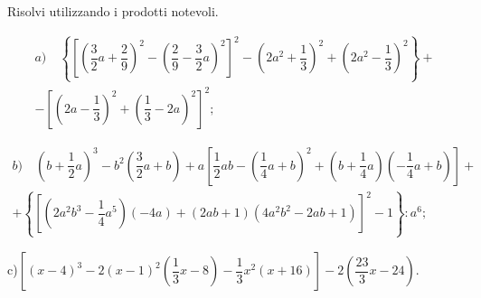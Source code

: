\begin{esercizio}[\Ast]
 \label{ese:12.39}
Risolvi utilizzando i prodotti notevoli.

 \begin{multline*} a)\quad \left\lbrace\left[\left(\dfrac{3}{2}a+\dfrac{2}{9}\right)^{2}-\left(\dfrac{2}{9}-\dfrac{3}{2}a\right)^{2}\right]^{2}-\left(2a^{2}+\dfrac{1}{3}\right)^{2}+\left(2a^{2}-\dfrac{1}{3}\right)^{2}\right\rbrace+\\-\left[\left(2a-\dfrac{1}{3}\right)^{2}+\left(\dfrac{1}{3}-2a\right)^{2}\right]^{2};\end{multline*}
 
 \begin{multline*} b)\quad \left(b+\dfrac{1}{2}a\right)^{3}-b^{2}\left(\dfrac{3}{2}a+b\right)+a\left[\dfrac{1}{2}ab-\left(\dfrac{1}{4}a+b\right)^{2}+\left(b+\dfrac{1}{4}a\right)\left(-\dfrac{1}{4}a+b\right)\right]+\\+\left\lbrace\left[\left(2a^{2}b^{3}-\dfrac{1}{4}a^{5}\right)(-4a)+(2ab+1)\left(4a^{2}b^{2}-2ab+1\right)\right]^{2}-1\right\rbrace:a^{6};\end{multline*}
 
 c)\quad $\left[(x-4)^{3}-2(x-1)^{2}\left(\dfrac{1}{3}x-8\right)-\dfrac{1}{3}x^{2}(x+16)\right]-2\left(\dfrac{23}{3}x-24\right)$.
\end{esercizio}

